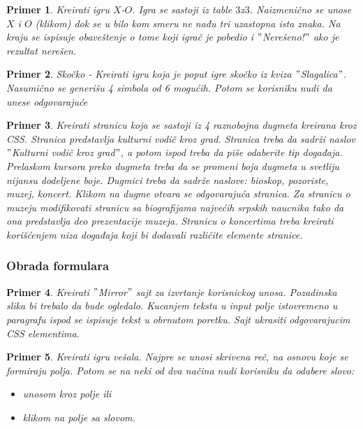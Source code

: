 \documentclass[a4paper]{article}
\newtheorem{primer}{Primer}[section]
\begin{document}
\begin{primer}
Kreirati igru $X$-$O$. Igra se sastoji iz table $3$x$3$. Naizmenično se unose $X$ i $O$ (klikom) dok se u bilo kom smeru ne nađu tri uzastopna ista znaka. Na kraju se ispisuje obaveštenje o tome koji igrač je pobedio i $"$Nerešeno!$"$ ako je rezultat nerešen.
\end{primer}


\begin{primer}
Skočko - Kreirati igru koja je poput igre skočko iz kviza $"$Slagalica$"$. Nasumično se generišu 4 simbola od 6 mogućih. Potom se korisniku nudi da unese odgovarajuće
\end{primer}

\begin{primer}
Kreirati stranicu koja se sastoji iz 4 raznobojna dugmeta kreirana kroz CSS. Stranica predstavlja kulturni vodič kroz grad. Stranica treba da sadrži naslov $"$Kulturni vodič kroz grad$"$, a potom ispod treba da piše odaberite tip događaja. Prelaskom kursora preko dugmeta treba da se promeni boja dugmeta u svetliju nijansu dodeljene boje. Dugmici treba da sadrže naslove: bioskop, pozoriste, muzej, koncert. Klikom na dugme otvara se odgovarajuća stranica. Za stranicu o muzeju modifikovati stranicu sa biografijama najvećih srpskih naucnika tako da ona predstavlja deo prezentacije muzeja. Stranicu o koncertima treba kreirati korišćenjem niza događaja koji bi dodavali različite elemente stranice. 
\end{primer}

\subsubsection{Obrada formulara}

\begin{primer}
Kreirati $"$Mirror$"$ sajt za izvrtanje korisnickog unosa. Pozadinska slika bi trebalo da bude
ogledalo. Kucanjem teksta u input polje istovremeno u paragrafu ispod se ispisuje tekst u 
obrnutom poretku. Sajt ukrasiti odgovarajucim CSS elementima.
\end{primer}

\begin{primer}
Kreirati igru vešala. Najpre se unosi skrivena reč, na osnovu koje se formiraju polja. Potom se na neki od dva načina nudi korisniku da odabere slovo:
\begin{itemize}
\item unosom kroz polje ili
\item klikom na polje sa slovom.
\end{itemize}

\end{primer}
\end{document}
